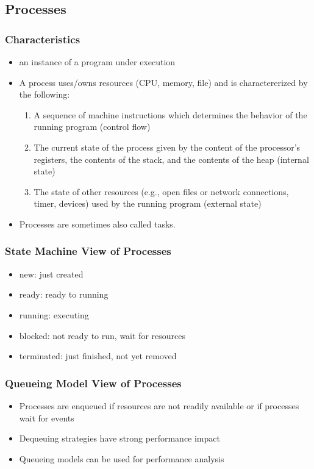 \documentclass[11pt]{article}
\begin{document}
\subsection{Processes}
\label{sec:orge3d4cd7}
\subsubsection{Characteristics}
\label{sec:org4d62b43}
\begin{itemize}
\item an instance of a program under execution
\item A process uses/owns resources (CPU, memory, file) and is charactererized by the following:
\begin{enumerate}
\item A sequence of machine instructions which determines the behavior of the running program (control flow)
\item The current state of the process given by the content of the processor’s registers, the contents of the stack, and the contents of the heap (internal state)
\item The state of other resources (e.g., open files or network connections, timer, devices) used by the running program (external state)
\end{enumerate}
\item Processes are sometimes also called tasks.
\end{itemize}
\subsubsection{State Machine View of Processes}
\label{sec:orga74aea9}
\begin{itemize}
\item new: just created
\item ready: ready to running
\item running: executing
\item blocked: not ready to run, wait for resources
\item terminated: just finished, not yet removed
\end{itemize}
\subsubsection{Queueing Model View of Processes}
\label{sec:org9fc01eb}
\begin{itemize}
\item Processes are enqueued if resources are not readily available or if processes wait for events
\item Dequeuing strategies have strong performance impact
\item Queueing models can be used for performance analysis
\end{itemize}
\end{document}
